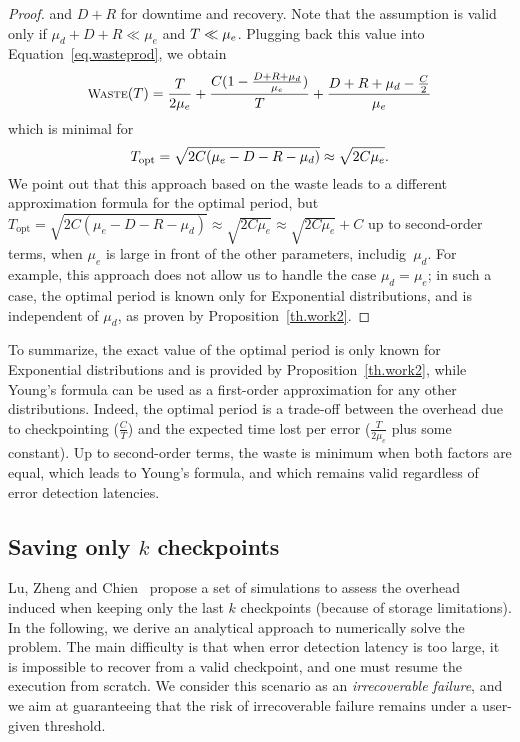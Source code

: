 \documentclass[10pt,table]{article}
\newcommand{\ema}[1]{\ensuremath{#1}\xspace}
\newcommand{\mue}{\ema{\mu_{e}}}
\newcommand{\mud}{\ema{\mu_{d}}}
\newcommand{\ccc}{\ema{C}}
\newcommand{\rrr}{\ema{R}}
\newcommand{\ddd}{\ema{D}}
\newcommand{\Waste}{\ema{\textsc{Waste}}}
\newcommand{\Topt}{\ema{T_{\text{opt}}}}
\begin{document}
\begin{proof}
and $\ddd+\rrr$ for downtime and recovery. Note that the assumption is valid only if
$\mud+\ddd+\rrr \ll \mue$ and $\T \ll \mue$.
Plugging back this value into Equation~\eqref{eq.wasteprod},
we obtain 
\begin{equation}
\small
\Waste(\T) = \frac{\T}{2 \mue} + \frac{\ccc(1-\frac{\ddd+\rrr+\mud}{\mue})}{\T}+\frac{\ddd+\rrr+\mud-\frac{\ccc}{2}}{\mue}
\label{eq.wasteT}
\end{equation}
which is minimal for 
\begin{equation}
\small
\Topt = \sqrt{2 \ccc (\mue - \ddd - \rrr - \mud)} \approx \sqrt{2 \ccc \mue} .
\label{eq.tauopt}
\end{equation}
We point out that this approach based on the waste leads to a different approximation
formula for the optimal period,
but $\Topt = \sqrt{2 \ccc (\mue - \ddd - \rrr - \mud)} \approx \sqrt{2 \ccc \mue} \approx \sqrt{2 \ccc \mue} + \ccc$ up to second-order terms, when $\mue$ is large in front of the other parameters, includig~\mud.
For example, this approach does not allow us to handle the case $\mud=\mue$; in such a case, the optimal
period is known only for Exponential distributions, and is independent of \mud, as proven by
Proposition~\ref{th.work2}.
\end{proof}

To summarize, the exact value of the optimal period is only known for Exponential distributions and is provided  by Proposition~\ref{th.work2},  while  Young's formula can be used as a first-order approximation
for any other distributions.  Indeed, the
optimal period is a trade-off
between the overhead due to checkpointing ($\frac{\ccc}{T}$) and the expected time lost per error
($\frac{T}{2 \mue}$ plus some constant). Up to second-order terms, the waste is minimum when both factors are equal, which leads to Young's formula, and which remains valid regardless of error detection latencies.


\subsection{Saving only $k$ checkpoints}
\label{sec.chien-k}

Lu, Zheng and Chien~\cite{LuZhengChien2013} propose a set of simulations to assess 
the overhead induced when keeping only the last $k$ checkpoints (because of storage limitations). 
In the following, we derive an analytical approach to numerically solve the problem. 
The main difficulty is that when error detection latency is too large, it is impossible 
to recover from a valid checkpoint, and one must resume the execution from scratch. 
We consider this scenario as an \emph{irrecoverable failure}, and we aim at guaranteeing 
that the risk of  irrecoverable failure remains under a user-given threshold.
\end{document}
